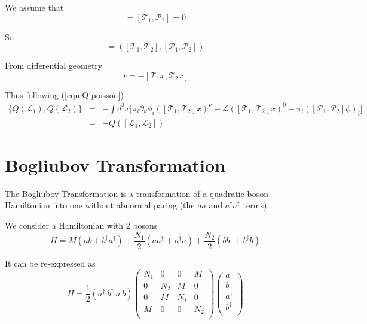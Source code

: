 \documentclass[12pt]{book}
\begin{document}
		
	We assume that
	\begin{equation}
	[\mathcal P_1,\mathcal T_2]=[\mathcal T_1,\mathcal P_2]=0
	\end{equation}
	
	So
	\begin{equation}
	[\mathcal L_1,\mathcal L_2]=([\mathcal T_1,\mathcal T_2],[\mathcal P_1,\mathcal P_2])
	\end{equation}
	
	From differential geometry
	\begin{equation}
	[\mathcal T_1,\mathcal T_2]x=-[\mathcal T_1x,\mathcal T_2x]
	\end{equation}
	
	
	Thus following (\ref{eqn:Q-poisson})
	\begin{eqnarray}
		\{Q(\mathcal L_1),Q(\mathcal L_2)\}&=&-\int d^3x\Big[\pi_i\partial_\nu\phi_i([\mathcal T_1,\mathcal T_2]x)^\nu-\mathcal L([\mathcal T_1,\mathcal T_2]x)^0-\pi_i([\mathcal P_1,\mathcal P_2]\phi)_i\Big]\\
		&=&-Q([\mathcal L_1,\mathcal L_2])
	\end{eqnarray}

	\chapter{Bogliubov Transformation}
	
	The Bogliubov Transformation is a transformation of a quadratic boson Hamiltonian into one without abnormal paring (the $aa$ and $a^\dagger a^\dagger$ terms).
	
	We consider a Hamiltonian with 2 bosons
	\begin{equation}
		H=M(ab+b^\dagger a^\dagger)+\frac {N_1}2(aa^\dagger+a^\dagger a)+\frac {N_2}2(bb^\dagger+b^\dagger b)
	\end{equation}
	
	It can be re-expressed as
	\begin{equation}
		H=\frac 12(a^\dagger\ b^\dagger\ a\ b)
		\left(\begin{array}{cccc}
		N_1&0&0&M\\
		0&N_2&M&0\\
		0&M&N_1&0\\
		M&0&0&N_2\\
		\end{array}\right)
		\left(\begin{array}{c}
		a\\
		b\\
		a^\dagger\\
		b^\dagger\\
		\end{array}\right)\label{eqn:bt_hami}
	\end{equation}
	
\end{document}
